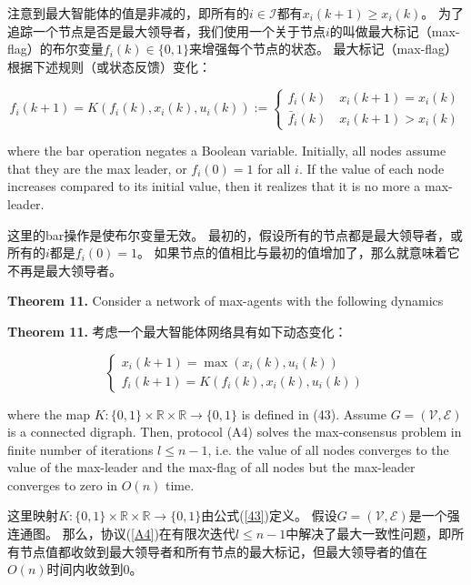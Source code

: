 \documentclass{article}
\begin{document}
注意到最大智能体的值是非减的，即所有的$i\in\mathcal{I}$都有$x_i(k+1)\ge x_i(k)$。
为了追踪一个节点是否是最大领导者，我们使用一个关于节点$i$的叫做最大标记（max-flag）的布尔变量$f_i(k)\in\{0,1\}$来增强每个节点的状态。
最大标记（max-flag）根据下述规则（或状态反馈）变化：

\begin{equation}
    \tag{43}
    \label{43}
    f_i(k+1) = K(f_i(k),x_i(k),u_i(k)):=
    \left\{
        \begin{matrix}
            f_i(k)\quad x_i(k+1)=x_i(k)\\
            \bar{f}_i(k) \quad x_i(k+1)>x_i(k)
        \end{matrix}
    \right.
\end{equation}

{\color[gray]{0.5}
\noindent where the bar operation negates a Boolean variable. 
Initially, all nodes assume that they are the max leader, or $f_i(0)=1$ for all $i$. 
If the value of each node increases compared to its initial value, then it realizes that it is no more a max-leader.
}

\noindent 这里的bar操作是使布尔变量无效。
最初的，假设所有的节点都是最大领导者，或所有的$i$都是$f_i(0)=1$。
如果节点的值相比与最初的值增加了，那么就意味着它不再是最大领导者。

{\color[gray]{0.5}
\noindent\textbf{Theorem 11.} Consider a network of max-agents with the following dynamics
}

\noindent\textbf{Theorem 11.} 考虑一个最大智能体网络具有如下动态变化：

\begin{equation}
    \tag{44}
    \label{44}
    \left\{
        \begin{matrix}
            x_i(k+1) = \max(x_i(k),u_i(k))\\
            f_i(k+1) = K(f_i(k),x_i(k),u_i(k))
        \end{matrix}
    \right.
\end{equation}

{\color[gray]{0.5}
\noindent where the map $K:\{0,1\}\times \mathbb{R}\times\mathbb{R}\rightarrow\{0,1\}$ is deﬁned in (43). 
Assume $G=(\mathcal{V},\mathcal{E})$ is a connected digraph. 
Then, protocol (A4) solves the max-consensus problem in finite number of iterations $l\le n-1$, i.e. the value of all nodes converges to the value of the max-leader and the max-flag of all nodes but the max-leader converges to zero in $O(n)$ time. 
}

\noindent 这里映射$K:\{0,1\}\times \mathbb{R}\times\mathbb{R}\rightarrow\{0,1\}$由公式(\ref{43})定义。
假设$G=(\mathcal{V},\mathcal{E})$是一个强连通图。
那么，协议(\ref{A4})在有限次迭代$l\le n-1$中解决了最大一致性问题，即所有节点值都收敛到最大领导者和所有节点的最大标记，但最大领导者的值在$O(n)$时间内收敛到0。
\end{document}
